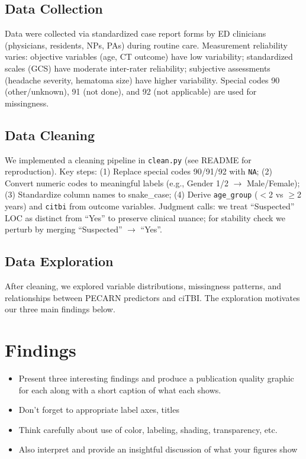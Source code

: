 \documentclass[10pt,letterpaper]{article}
\begin{document}
\subsection{Data Collection}\label{data-collection}

Data were collected via standardized case report forms by ED clinicians (physicians, residents, NPs, PAs) during routine care. Measurement reliability varies: objective variables (age, CT outcome) have low variability; standardized scales (GCS) have moderate inter-rater reliability; subjective assessments (headache severity, hematoma size) have higher variability. Special codes 90 (other/unknown), 91 (not done), and 92 (not applicable) are used for missingness.

\subsection{Data Cleaning}\label{data-cleaning}

We implemented a cleaning pipeline in \texttt{clean.py} (see README for reproduction). Key steps: (1) Replace special codes 90/91/92 with \texttt{NA}; (2) Convert numeric codes to meaningful labels (e.g., Gender 1/2 $\to$ Male/Female); (3) Standardize column names to snake\_case; (4) Derive \texttt{age\_group} ($<$2 vs $\ge$2 years) and \texttt{citbi} from outcome variables. Judgment calls: we treat ``Suspected'' LOC as distinct from ``Yes'' to preserve clinical nuance; for stability check we perturb by merging ``Suspected'' $\to$ ``Yes''.

\subsection{Data Exploration}\label{data-exploration}

After cleaning, we explored variable distributions, missingness patterns, and relationships between PECARN predictors and ciTBI. The exploration motivates our three main findings below.

\section{Findings}\label{findings}

\begin{itemize}
\item Present three interesting findings and produce a publication quality graphic for each along with a short caption of what each shows.
\item Don't forget to appropriate label axes, titles
\item Think carefully about use of color, labeling, shading, transparency, etc.
\item Also interpret and provide an insightful discussion of what your figures show
\end{itemize}
\end{document}

